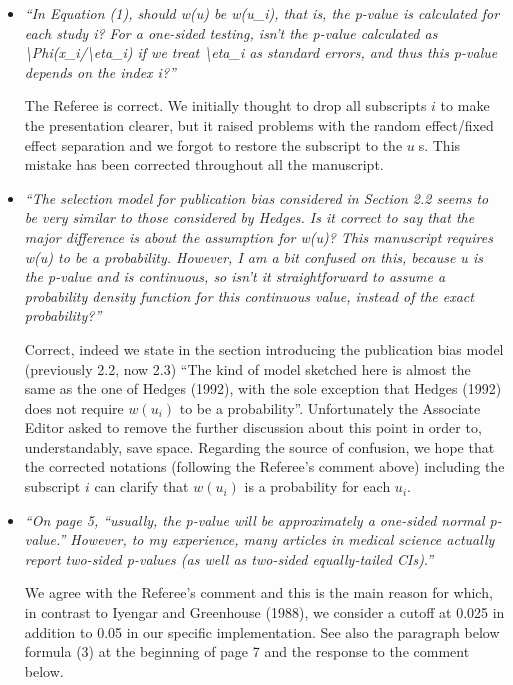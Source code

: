 \documentclass[11pt]{article}
\begin{document}
\begin{itemize}
\item \emph{``In Equation (1), should w(u) be w(u\_i), that is, the p-value is calculated for each study i? For a one-sided testing, isn't the p-value calculated as \textbackslash Phi(\textbar x\_i\textbar/\textbackslash eta\_i) if we treat \textbackslash eta\_i as standard errors, and thus this p-value depends on the index i?''}


The Referee is correct. We initially thought to drop all subscripts $i$ to make the presentation clearer, but it raised problems with the random effect/fixed effect separation and we forgot to restore the subscript to the $u\;$s. This mistake has been corrected throughout all the manuscript.



\item \emph{``The selection model for publication bias considered in Section 2.2 seems to be very similar to those considered by Hedges. Is it correct to say that the major difference is about the assumption for w(u)? This manuscript requires w(u) to be a probability. However, I am a bit confused on this, because u is the p-value and is continuous, so isn't it straightforward to assume a probability density function for this continuous value, instead of the exact probability?''}


Correct, indeed we state in the section introducing the publication bias model (previously 2.2, now 2.3) ``The kind of model sketched here is almost the same as the one of Hedges (1992), with the sole exception that Hedges (1992) does not require $w(u_i)$ to be a probability''. Unfortunately the Associate Editor asked to remove the further discussion about this point in order to, understandably, save space. Regarding the source of confusion, we hope that the corrected notations (following the Referee's comment above) including the subscript $i$ can clarify that $w(u_i)$ is a probability for each $u_i$.



\item \emph{``On page 5, ``usually, the p-value will be approximately a one-sided normal p-value.'' However, to my experience, many articles in medical science actually report two-sided p-values (as well as two-sided equally-tailed CIs).''}


We agree with the Referee's comment and this is the main reason for which, in contrast to Iyengar and Greenhouse (1988), we consider a cutoff at 0.025 in addition to 0.05 in our specific implementation. See also the paragraph below formula (3) at the beginning of page 7 and the response to the comment below.




\end{itemize}
\end{document}
